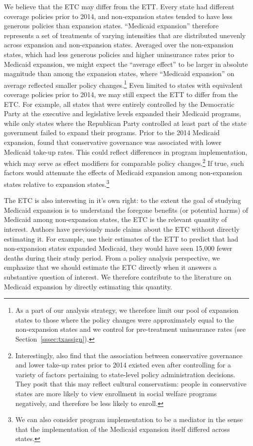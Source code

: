 \documentclass[aoas]{imsart}
\theoremstyle{plain}
\theoremstyle{remark}
\begin{document}
We believe that the ETC may differ from the ETT. Every state had different coverage policies prior to 2014, and non-expansion states tended to have less generous policies than expansion states. ``Medicaid expansion'' therefore represents a set of treatments of varying intensities that are distributed unevenly across expansion and non-expansion states. Averaged over the non-expansion states, which had less generous policies and higher uninsurance rates prior to Medicaid expansion, we might expect the ``average effect'' to be larger in absolute magnitude than among the expansion states, where ``Medicaid expansion'' on average reflected smaller policy changes.\footnote{As a part of our analysis strategy, we therefore limit our pool of expansion states to those where the policy changes were approximately equal to the non-expansion states and we control for pre-treatment uninsurance rates (see Section~\ref{sssec:txassign}).} Even limited to states with equivalent coverage policies prior to 2014, we may still expect the ETT to differ from the ETC. For example, all states that were entirely controlled by the Democratic Party at the executive and legislative levels expanded their Medicaid programs, while only states where the Republican Party controlled at least part of the state government failed to expand their programs. Prior to the 2014 Medicaid expansion, \cite{sommers2012understanding} found that conservative governance was associated with lower Medicaid take-up rates. This could reflect differences in program implementation, which may serve as effect modifiers for comparable policy changes.\footnote{Interestingly, \cite{sommers2012understanding} also find that the association between conservative governance and lower take-up rates prior to 2014 existed even after controlling for a variety of factors pertaining to state-level policy administration decisions. They posit that this may reflect cultural conservatism: people in conservative states are more likely to view enrollment in social welfare programs negatively, and therefore be less likely to enroll.} If true, such factors would attenuate the effects of Medicaid expansion among non-expansion states relative to expansion states.\footnote{We can also consider program implementation to be a mediator in the sense that the implementation of the Medicaid expansion itself differed across states.}

The ETC is also interesting in it's own right: to the extent the goal of studying Medicaid expansion is to understand the foregone benefits (or potential harms) of Medicaid among non-expansion states, the ETC is the relevant quantity of interest. Authors have previously made claims about the ETC without directly estimating it. For example, \cite{miller2019medicaid} use their estimates of the ETT to predict that had non-expansion states expanded Medicaid, they would have seen 15,000 fewer deaths during their study period. From a policy analysis perspective, we emphasize that we should estimate the ETC directly when it answers a substantive question of interest. We therefore contribute to the literature on Medicaid expansion by directly estimating this quantity.
\end{document}
